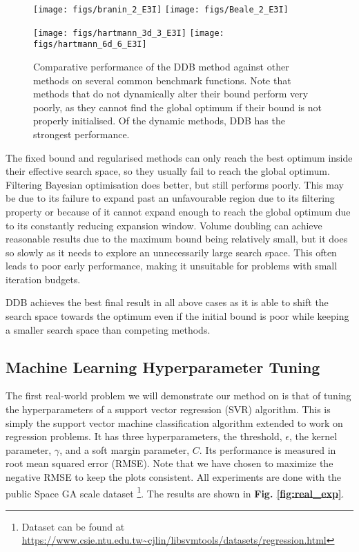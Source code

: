 \documentclass[preprint]{elsarticle}
\begin{document}
\begin{figure}[h]
\centering
\texttt{[image: figs/branin\_2\_E3I]}
\texttt{[image: figs/Beale\_2\_E3I]}
 
\texttt{[image: figs/hartmann\_3d\_3\_E3I]}
\texttt{[image: figs/hartmann\_6d\_6\_E3I]}  
\caption{Comparative performance of the DDB method against other methods on several common benchmark functions. Note that methods that do not dynamically alter their bound perform very poorly, as they cannot find the global optimum if their bound is not properly initialised. Of the dynamic methods, DDB has the strongest performance. \label{fig:benchmarks}}
\end{figure}

The fixed bound and regularised methods can only reach the best optimum inside their effective search space, so they usually fail to reach the global optimum. Filtering Bayesian optimisation does better, but still performs poorly. This may be due to its failure to expand past an unfavourable region due to its filtering property or because of it cannot expand enough to reach the global optimum due to its constantly reducing expansion window. Volume doubling can achieve reasonable results due to the maximum bound being relatively small, but it does so slowly as it needs to explore an unnecessarily large search space. This often leads to poor early performance, making it unsuitable for problems with small iteration budgets.

DDB achieves the best final result in all above cases as it is able to shift the search space towards the optimum even if the initial bound is poor while keeping a smaller search space than competing methods.

\subsection{Machine Learning Hyperparameter Tuning}

The first real-world problem we will demonstrate our method on is that of tuning the hyperparameters of a support vector regression (SVR) \citep{drucker1997support} algorithm. This is simply the support vector machine classification algorithm extended to work on regression problems. It has three hyperparameters, the threshold, $\epsilon$, the kernel parameter, $\gamma$, and a soft margin parameter, $C$. Its performance is measured in root mean squared error (RMSE). Note that we have chosen to maximize the negative RMSE to keep the plots consistent. All experiments are done with the public Space GA scale dataset \footnote{ Dataset can be found at \url{https://www.csie.ntu.edu.tw~cjlin/libsvmtools/datasets/regression.html}}. The results are shown in\textbf{ Fig. \ref{fig:real_exp}}.
\end{document}
